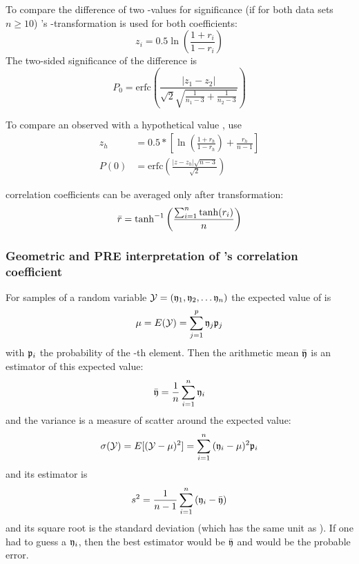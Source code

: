\begin{refsection}
To compare the difference of two -values for significance (if for both data sets \(n \geq 10 \)) 's -transformation is used for both coefficients:
\begin{equation}
  z_i = 0.5 \ln\left(\frac{1+r_i}{1-r_i}\right)
\end{equation}
The two-sided significance of the difference is
\begin{equation}
  P_0 = \mathrm{erfc}\left(\frac{|z_1 - z_2|}{\sqrt{2} \sqrt{\frac{1}{n_1 -3} + \frac{1}{n_2 - 3}}}\right)
\end{equation}

To compare an observed  with a hypothetical value , use
\begin{align}
  z_h & = 0.5 * \left[\ln\left(\frac{1 + r_h}{1-r_h}\right) + \frac{r_h}{n-1}\right] \\
  P(0)    & = \mathrm{erfc}\left(\frac{|z - z_h| \sqrt{n-3}}{\sqrt{2}}\right)
\end{align}

 correlation coefficients can be averaged only after transformation:
\begin{equation} \label{eqn:AvCorr}
  \bar{r} = \tanh^{-1}\left(\frac{\sum_{i=1}^n{\tanh(r_i)}}{n}\right)
\end{equation}

\subsubsection{Geometric and PRE interpretation of 's correlation coefficient}

For  samples of a random variable \(\mathcal{Y} = (\mathfrak{y}_1, \mathfrak{y}_2, \ldots \mathfrak{y}_n) \) the expected value of  is \parencite{Gni-13}
\begin{equation}
  \mu = E(\mathcal{Y}) = \sum_{j=1}^p{\mathfrak{y}_j \mathfrak{p}_j}
\end{equation}
with \(\mathfrak{p}_i \) the probability of the -th element. Then the arithmetic mean \(\bar{\mathfrak{y}} \) is an estimator of this expected value:
\begin{equation}
  \bar{\mathfrak{y}} = \frac{1}{n} \sum_{i=1}^n{\mathfrak{y}_i}
\end{equation}
and the variance is a measure of scatter around the expected value:
\begin{equation}
  \sigma(\mathcal{Y}) = E[(\mathcal{Y}-\mu)^2] = \sum_{i=1}^n{(\mathfrak{y}_i-\mu)^2 \mathfrak{p}_i}
\end{equation}
and its estimator is
\begin{equation}
  s^2 = \frac{1}{n-1} \sum_{i=1}^n{(\mathfrak{y}_i - \bar{\mathfrak{y}})}
\end{equation}
and its square root is the standard deviation  (which has the same unit as ). If one had to guess a \(\mathfrak{y}_i \), then the best estimator would be \(\bar{\mathfrak{y}} \) and  would be the probable error.


\end{refsection}
